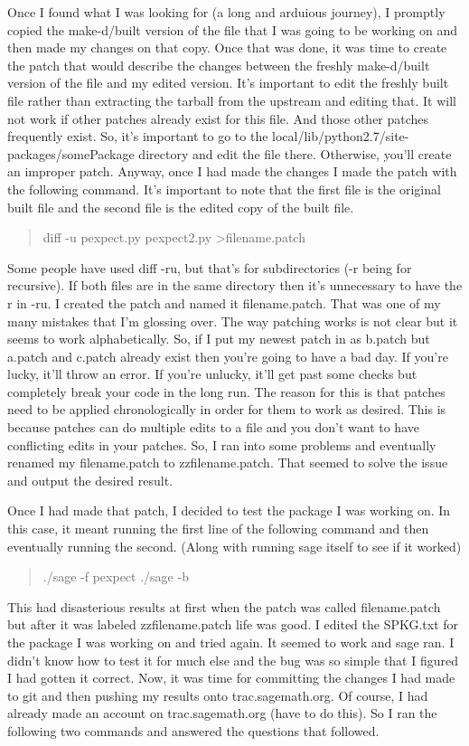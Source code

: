 \documentclass{article}
\begin{document}
Once I found what I was looking for (a long and arduious journey), I promptly copied the make-d/built version of the file that I was going to be working on and then made my changes on that copy. Once that was done, it was time to create the patch that would describe the changes between the freshly make-d/built version of the file and my edited version. It's important to edit the freshly built file rather than extracting the tarball from the upstream and editing that. It will not work if other patches already exist for this file. And those other patches frequently exist. So, it's important to go to the local/lib/python2.7/site-packages/somePackage directory and edit the file there. Otherwise, you'll create an improper patch. Anyway, once I had made the changes I made the patch with the following command. It's important to note that the first file is the original built file and the second file is the edited copy of the built file.

\begin{quote}
diff -u pexpect.py pexpect2.py \textgreater \space filename.patch
\end{quote}

Some people have used diff -ru, but that's for subdirectories (-r being for recursive). If both files are in the same directory then it's unnecessary to have the r in -ru. I created the patch and named it filename.patch. That was one of my many mistakes that I'm glossing over. The way patching works is not clear but it seems to work alphabetically. So, if I put my newest patch in as b.patch but a.patch and c.patch already exist then you're going to have a bad day. If you're lucky, it'll throw an error. If you're unlucky, it'll get past some checks but completely break your code in the long run. The reason for this is that patches need to be applied chronologically in order for them to work as desired. This is because patches can do multiple edits to a file and you don't want to have conflicting edits in your patches. So, I ran into some problems and eventually renamed my filename.patch to zzfilename.patch. That seemed to solve the issue and output the desired result.

Once I had made that patch, I decided to test the package I was working on. In this case, it meant running the first line of the following command and then eventually running the second. (Along with running sage itself to see if it worked)
\begin{quote}
./sage -f pexpect \newline
./sage -b
\end{quote}
This had disasterious results at first when the patch was called filename.patch but after it was labeled zzfilename.patch life was good. I edited the SPKG.txt for the package I was working on and tried again. It seemed to work and sage ran. I didn't know how to test it for much else and the bug was so simple that I figured I had gotten it correct. Now, it was time for committing the changes I had made to git and then pushing my results onto trac.sagemath.org. Of course, I had already made an account on trac.sagemath.org (have to do this). So I ran the following two commands and answered the questions that followed.
\end{document}
